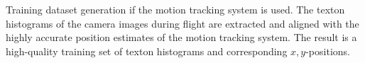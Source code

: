 Training dataset generation if the motion tracking system is used. The texton histograms of the camera images during flight are extracted and aligned with the highly accurate position estimates of the motion tracking system. The result is a high-quality training set of texton histograms and corresponding $x,y$-positions. 